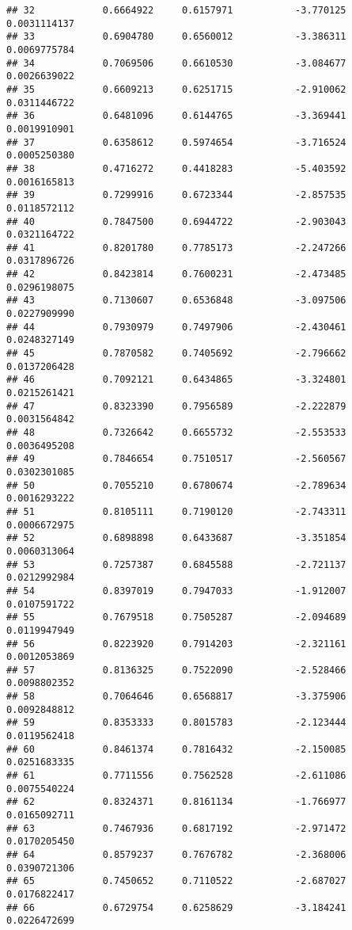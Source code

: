 \documentclass[]{article}
\begin{document}
\begin{verbatim}
## 32            0.6664922     0.6157971           -3.770125  0.0031114137
## 33            0.6904780     0.6560012           -3.386311  0.0069775784
## 34            0.7069506     0.6610530           -3.084677  0.0026639022
## 35            0.6609213     0.6251715           -2.910062  0.0311446722
## 36            0.6481096     0.6144765           -3.369441  0.0019910901
## 37            0.6358612     0.5974654           -3.716524  0.0005250380
## 38            0.4716272     0.4418283           -5.403592  0.0016165813
## 39            0.7299916     0.6723344           -2.857535  0.0118572112
## 40            0.7847500     0.6944722           -2.903043  0.0321164722
## 41            0.8201780     0.7785173           -2.247266  0.0317896726
## 42            0.8423814     0.7600231           -2.473485  0.0296198075
## 43            0.7130607     0.6536848           -3.097506  0.0227909990
## 44            0.7930979     0.7497906           -2.430461  0.0248327149
## 45            0.7870582     0.7405692           -2.796662  0.0137206428
## 46            0.7092121     0.6434865           -3.324801  0.0215261421
## 47            0.8323390     0.7956589           -2.222879  0.0031564842
## 48            0.7326642     0.6655732           -2.553533  0.0036495208
## 49            0.7846654     0.7510517           -2.560567  0.0302301085
## 50            0.7055210     0.6780674           -2.789634  0.0016293222
## 51            0.8105111     0.7190120           -2.743311  0.0006672975
## 52            0.6898898     0.6433687           -3.351854  0.0060313064
## 53            0.7257387     0.6845588           -2.721137  0.0212992984
## 54            0.8397019     0.7947033           -1.912007  0.0107591722
## 55            0.7679518     0.7505287           -2.094689  0.0119947949
## 56            0.8223920     0.7914203           -2.321161  0.0012053869
## 57            0.8136325     0.7522090           -2.528466  0.0098802352
## 58            0.7064646     0.6568817           -3.375906  0.0092848812
## 59            0.8353333     0.8015783           -2.123444  0.0119562418
## 60            0.8461374     0.7816432           -2.150085  0.0251683335
## 61            0.7711556     0.7562528           -2.611086  0.0075540224
## 62            0.8324371     0.8161134           -1.766977  0.0165092711
## 63            0.7467936     0.6817192           -2.971472  0.0170205450
## 64            0.8579237     0.7676782           -2.368006  0.0390721306
## 65            0.7450652     0.7110522           -2.687027  0.0176822417
## 66            0.6729754     0.6258629           -3.184241  0.0226472699

\end{verbatim}
\end{document}
